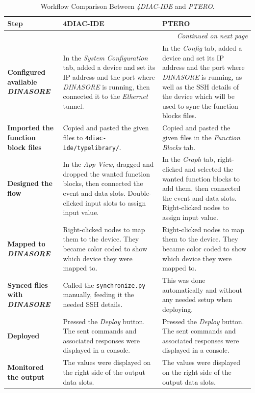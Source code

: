 \begin{longtable}{p{2.5cm}p{6cm}p{5.5cm}}
\caption{Workflow Comparison Between \textit{4DIAC-IDE} and \textit{PTERO}.} \label{tab:workflow-comparison} \\
\hline
\textbf{Step} & \textbf{4DIAC-IDE} & \textbf{PTERO} \\ \hline
\endhead

\hline
\multicolumn{3}{r}{\textit{Continued on next page}} \\
\endfoot
\hline
\endfoot
\endlastfoot

\textbf{Configured available \textit{DINASORE}} &
In the \textit{System Configuration} tab, added a device and set its IP address and the port where \textit{DINASORE} is running, then connected it to the \textit{Ethernet} tunnel. &
In the \textit{Config} tab, added a device and set its IP address and the port where \textit{DINASORE} is running, as well as the SSH details of the device which will be used to sync the function blocks files. \\ \hline

\textbf{Imported the function block files} &
Copied and pasted the given files to \texttt{4diac-ide/typelibrary/}. &
Copied and pasted the given files in the \textit{Function Blocks} tab. \\ \hline

\textbf{Designed the flow} &
In the \textit{App View}, dragged and dropped the wanted function blocks, then connected the event and data slots. Double-clicked input slots to assign input value. &
In the \textit{Graph} tab, right-clicked and selected the wanted function blocks to add them, then connected the event and data slots. Right-clicked nodes to assign input value. \\ \hline

\textbf{Mapped to \textit{DINASORE}} &
Right-clicked nodes to map them to the device. They became color coded to show which device they were mapped to. &
Right-clicked nodes to map them to the device. They became color coded to show which device they were mapped to. \\ \hline

\textbf{Synced files with \textit{DINASORE}} &
Called the \texttt{synchronize.py} manually, feeding it the needed SSH details. &
This was done automatically and without any needed setup when deploying. \\ \hline

\textbf{Deployed} &
Pressed the \textit{Deploy} button. The sent commands and associated responses were displayed in a console. &
Pressed the \textit{Deploy} button. The sent commands and associated responses were displayed in a console. \\ \hline

\textbf{Monitored the output} &
The values were displayed on the right side of the output data slots. &
The values were displayed on the right side of the output data slots. \\ \hline

\end{longtable}

